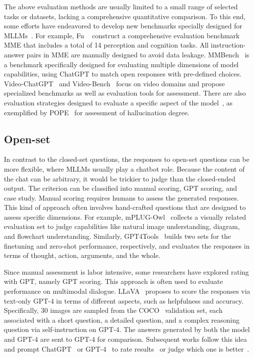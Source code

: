 The above evaluation methods are usually limited to a small range of selected tasks or datasets, lacking a comprehensive quantitative comparison. 
To this end, some efforts have endeavored to develop new benchmarks specially designed for MLLMs~\cite{mme,mmbench,mm-vet,seed-bench,mathvista,mmmu,hallusionbench}. 
For example, Fu \etal~\cite{mme} construct a comprehensive evaluation benchmark MME that includes a total of 14 perception and cognition tasks.
All instruction-answer pairs in MME are manually designed to avoid data leakage.
MMBench~\cite{mmbench} is a benchmark specifically designed for evaluating multiple dimensions of model capabilities, using ChatGPT to match open responses with pre-defined choices.
Video-ChatGPT~\cite{video-chatgpt} and Video-Bench~\cite{ning2023video} focus on video domains and propose specialized benchmarks as well as evaluation tools for assessment.
There are also evaluation strategies designed to evaluate a specific aspect of the model~\cite{multiinstruct}, as exemplified by POPE~\cite{li2023evaluating} for assessment of hallucination degree.


\subsection{Open-set}
In contrast to the closed-set questions, the responses to open-set questions can be more flexible, where MLLMs usually play a chatbot role.
Because the content of the chat can be arbitrary, it would be trickier to judge than the closed-ended output.
The criterion can be classified into manual scoring, GPT scoring, and case study. 
Manual scoring requires humans to assess the generated responses. 
This kind of approach often involves hand-crafted questions that are designed to assess specific dimensions. 
For example, mPLUG-Owl~\cite{mplug-owl} collects a visually related evaluation set to judge capabilities like natural image understanding, diagram, and flowchart understanding.  
Similarly, GPT4Tools~\cite{gpt4tools} builds two sets for the finetuning and zero-shot performance, respectively, and evaluates the responses in terms of thought, action, arguments, and the whole.

Since manual assessment is labor intensive, some researchers have explored rating with GPT, namely GPT scoring. 
This approach is often used to evaluate performance on multimodal dialogue. 
LLaVA~\cite{llava} proposes to score the responses via text-only GPT-4 in terms of different aspects, such as helpfulness and accuracy. 
Specifically, 30 images are sampled from the COCO~\cite{COCO} validation set, each associated with a short question, a detailed question, and a complex reasoning question via self-instruction on GPT-4. 
The answers generated by both the model and GPT-4 are sent to GPT-4 for comparison. 
Subsequent works follow this idea and prompt ChatGPT~\cite{mplug-owl} or GPT-4~\cite{x-llm, chatbridge, lavin, llava-med, m3it} to rate results~\cite{mplug-owl, x-llm, chatbridge, lavin, llava-med} or judge which one is better~\cite{llama-adapter-v2}.


